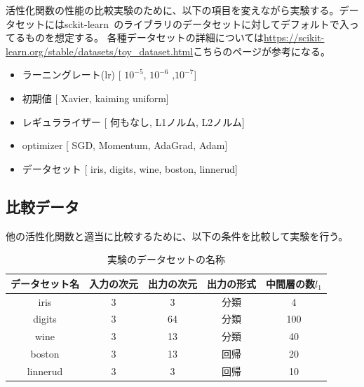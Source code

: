 活性化関数の性能の比較実験のために、以下の項目を変えながら実験する。データセットにはsckit-learn~\cite{scikit-learn}のライブラリのデータセットに対してデフォルトで入ってるものを想定する。
各種データセットの詳細については\url{https://scikit-learn.org/stable/datasets/toy_dataset.html}こちらのページが参考になる。

\begin{itemize}
\label{exp_list}
    \setlength{\parskip}{0cm} %
    \setlength{\itemsep}{0cm} %
    \item ラーニングレート(lr) [ $10^{-5}$, $10^{-6}$ ,$10^{-7}$]
    \item 初期値 [ Xavier, kaiming uniform]
    \item レギュラライザー [ 何もなし, L1ノルム, L2ノルム]
    \item optimizer [ SGD, Momentum, AdaGrad, Adam]
    \item データセット [ iris, digits, wine, boston, linnerud]
\end{itemize}

\subsection{比較データ}

他の活性化関数と適当に比較するために、以下の条件を比較して実験を行う。


\begin{table}[htbp]
    \begin{center}
        \caption{実験のデータセットの名称}
        \label{dataset_name}
        \vspace{5mm} 
        \begin{tabular}{ |c|c|c|c|c| }
        データセット名 & 入力の次元 & 出力の次元 & 出力の形式 & 中間層の数$ {l_1} $\\
        \hline
        iris         & 3         & 3        & 分類      & 4 \\
        digits       & 3         & 64       & 分類      & 100 \\
        wine        & 3         & 13       & 分類      & 40 \\
        boston       & 3         & 13        & 回帰      & 20 \\
        linnerud     & 3         & 3        & 回帰      & 10 \\
        \end{tabular}
    \end{center}
\end{table}


